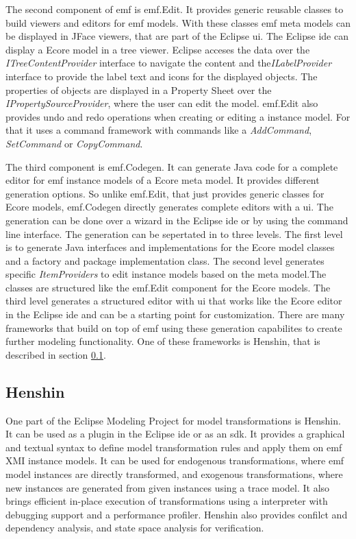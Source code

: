 \documentclass[conference,onecolumn]{IEEEtran}
\begin{document}
    The second component of \ac{emf} is \ac{emf}.Edit. It provides generic reusable classes to build viewers and editors for \ac{emf} models. With these classes \ac{emf} meta models can be displayed in JFace viewers, that are part of the Eclipse \acs{ui}. \cite{eclipse_emf} The Eclipse \ac{ide} can display a Ecore model in a tree viewer. Eclipse acceses the data over the \textit{ITreeContentProvider} interface to navigate the content and the\textit{ILabelProvider} interface to provide the label text and icons for the displayed objects.  The properties of objects are displayed in a Property Sheet over the \textit{IPropertySourceProvider}, where the user can edit the model.  \ac{emf}.Edit also provides undo and redo operations when creating or editing a instance model. For that it uses a command framework with commands like a \textit{AddCommand}, \textit{SetCommand} or \textit{CopyCommand}. \cite{emf}

    The third component is \ac{emf}.Codegen. It can generate Java code for a complete editor for \ac{emf} instance models of a Ecore meta model. It provides different generation options. So unlike \ac{emf}.Edit, that just provides generic classes for Ecore models, \ac{emf}.Codegen directly generates complete editors with a \acs{ui}. \cite{eclipse_emf} The generation can be done over a wizard in the Eclipse \ac{ide} or by using the command line interface. \cite{emf} The generation can be sepertated in to three levels. The first level is to generate Java interfaces and implementations for the Ecore model classes and a factory and package implementation class. The second level generates specific \textit{ItemProviders} to edit instance models based on the meta model.The classes are structured like the \ac{emf}.Edit component for the Ecore models. The third level generates a structured editor with \acs{ui} that works like the Ecore editor in the Eclipse \ac{ide} and can be a starting point for customization. \cite{eclipse_emf} There are many frameworks that build on top of \ac{emf} using these generation capabilites to create further modeling functionality. One of these frameworks is Henshin, that is described in section \ref{subsec:henshin}.

  \subsection{Henshin}
  \label{subsec:henshin}

  One part of the Eclipse Modeling Project for model transformations is Henshin. It can be used as a plugin in the Eclipse \ac{ide} or as an \acs{sdk}. It provides a graphical and textual syntax to define model transformation rules and apply them on \ac{emf} XMI instance models. It can be used for endogenous transformations, where \ac{emf} model instances are directly transformed, and exogenous transformations, where new instances are generated from given instances using a trace model. It also brings efficient in-place execution of transformations using a interpreter with debugging support and a performance profiler. Henshin also provides confilct and dependency analysis, and state space analysis for verification. \cite{henshin-repo}
\end{document}
